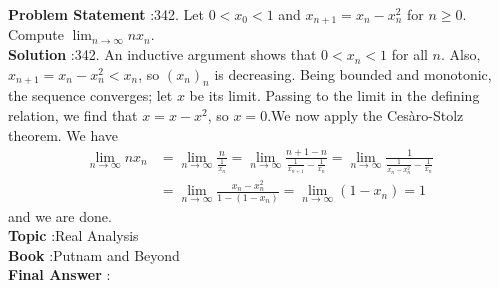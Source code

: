 \documentclass[10pt]{article}
\begin{document}
\textbf{Problem Statement} :342. Let $0<x_{0}<1$ and $x_{n+1}=x_{n}-x_{n}^{2}$ for $n \geq 0$. Compute $\lim _{n \rightarrow \infty} n x_{n}$.\\
\textbf{Solution} :342. An inductive argument shows that $0<x_{n}<1$ for all $n$. Also, $x_{n+1}=x_{n}-x_{n}^{2}<x_{n}$, so $\left(x_{n}\right)_{n}$ is decreasing. Being bounded and monotonic, the sequence converges; let $x$ be its limit. Passing to the limit in the defining relation, we find that $x=x-x^{2}$, so $x=0$.We now apply the Cesàro-Stolz theorem. We have$$ \begin{aligned} \lim _{n \rightarrow \infty} n x_{n} &=\lim _{n \rightarrow \infty} \frac{n}{\frac{1}{x_{n}}}=\lim _{n \rightarrow \infty} \frac{n+1-n}{\frac{1}{x_{n+1}}-\frac{1}{x_{n}}}=\lim _{n \rightarrow \infty} \frac{1}{\frac{1}{x_{n}-x_{n}^{2}}-\frac{1}{x_{n}}} \\ &=\lim _{n \rightarrow \infty} \frac{x_{n}-x_{n}^{2}}{1-\left(1-x_{n}\right)}=\lim _{n \rightarrow \infty}\left(1-x_{n}\right)=1 \end{aligned} $$and we are done.\\
\textbf{Topic} :Real Analysis\\
\textbf{Book} :Putnam and Beyond\\
\textbf{Final Answer} :\\
\end{document}
